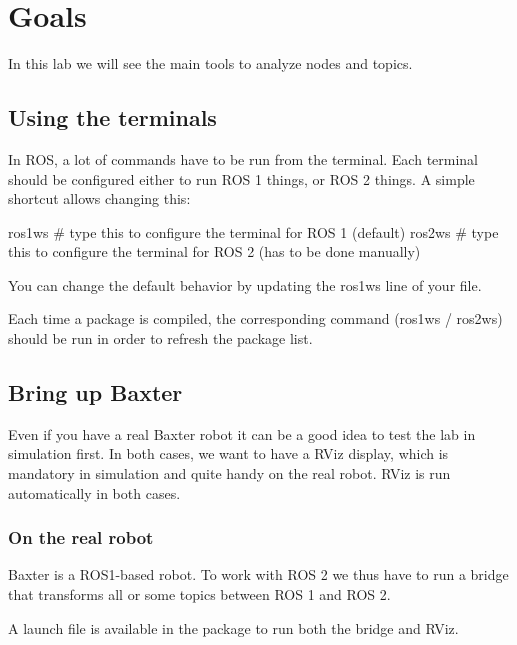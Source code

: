 \documentclass{ecnreport}
\author{O. Kermorgant}
\begin{document}


\section{Goals}

In this lab we will see the main tools to analyze nodes and topics.

\subsection{Using the terminals}

In ROS, a lot of commands have to be run from the terminal. Each terminal should be configured either to run ROS 1 things, or ROS 2 things.
A simple shortcut allows changing this:
\begin{bashcodelarge}
ros1ws  # type this to configure the terminal for ROS 1 (default)
ros2ws  # type this to configure the terminal for ROS 2 (has to be done manually)
\end{bashcodelarge}

You can change the default behavior by updating the ros1ws line of your  file.

Each time a package is compiled, the corresponding command (ros1ws / ros2ws) should be run in order to refresh the package list.

\subsection{Bring up Baxter}

Even if you have a real Baxter robot it can be a good idea to test the lab in simulation first.
In both cases, we want to have a RViz display, which is mandatory in simulation and quite handy on the real robot. RViz is run automatically in both cases.

\subsubsection{On the real robot}

Baxter is a ROS1-based robot. To work with ROS 2 we thus have to run a bridge that transforms all or some topics between ROS 1 and ROS 2.

A launch file is available in the  package to run both the bridge and RViz.
\end{document}
